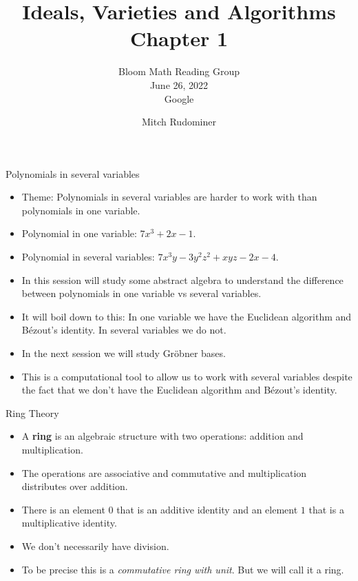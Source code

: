 \documentclass[handout]{beamer}
\title{Ideals, Varieties and Algorithms \\ Chapter 1}
\subtitle{Bloom Math Reading Group \\ June 26, 2022 \\ Google}
\author{Mitch Rudominer}
\date{}
\begin{document}
\begin{frame}
  \titlepage
\end{frame}

\begin{frame}{Polynomials in several variables}


\begin{itemize}
  \item Theme: Polynomials in several variables are harder to work with than polynomials in one variable.
  \item Polynomial in one variable: $7x^3 + 2x - 1$.
  \item Polynomial in several variables: $7x^3y - 3y^2z^2 + xyz -2x - 4$.
  \item In this session will study some abstract algebra to understand the difference between polynomials in one variable vs several variables.
  \item It will boil down to this: In one variable we have the Euclidean algorithm and B\'{e}zout's identity. In several variables we do not.
  \item In the next session we will study Gr\"{o}bner bases.
  \item This is a computational tool to allow us to work with several variables despite the fact that we don't have the Euclidean algorithm and B\'{e}zout's identity.
\end{itemize}

\end{frame}



\begin{frame}{Ring Theory}

\begin{itemize}
  \item A \textbf{ring} is an algebraic structure with two operations: addition and multiplication.
  \item The operations are associative and commutative and multiplication distributes over addition.
  \item There is an element $0$ that is an additive identity and an element $1$ that is a multiplicative identity.
  \item We don't necessarily have division.
  \item To be precise this is a \emph{commutative ring with unit}. But we will call it a ring.
\end{itemize}

\end{frame}
\end{document}
